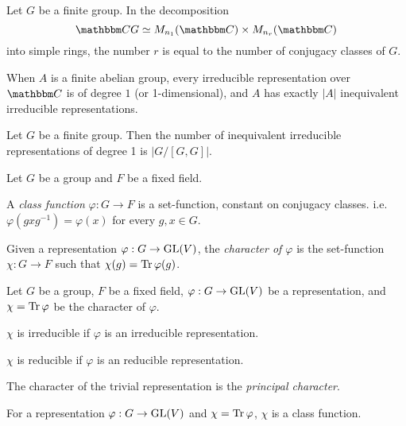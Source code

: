 \documentclass{article}
\begin{document}
\begin{theorem}
  Let \(G\) be a finite group.
  In the decomposition
  \[\bbC G \simeq M_{n_1}(\bbC) \times M_{n_r}(\bbC)\]
  into simple rings, the number \(r\) is equal to the number of
  conjugacy classes of \(G\).
\end{theorem}

\begin{corollary}
  When \(A\) is a finite abelian group,
  every irreducible representation over \(\bbC\) is of degree \(1\)
  (or 1-dimensional),
  and \(A\) has exactly \(|A|\) inequivalent irreducible representations.
\end{corollary}

\begin{theorem}
  Let \(G\) be a finite group.
  Then the number of inequivalent irreducible representations
  of degree 1 is \(|G / [G, G]|\).
\end{theorem}

\begin{definition}
  Let \(G\) be a group and \(F\) be a fixed field.

  A \emph{class function} \(\varphi: G \to F\) is a set-function,
  constant on conjugacy classes.
  i.e. \(\varphi(gxg^{-1}) = \varphi(x)\) for every \(g, x \in G\).

  Given a representation \(\varphi: G \to \textnormal{GL}(V)\), 
  the \emph{character of \(\varphi\)} is the set-function \(\chi: G \to F\)
  such that \(\chi(g) = \operatorname{Tr} \varphi(g)\).
\end{definition}

\begin{definition}
  Let \(G\) be a group, \(F\) be a fixed field, \(\varphi: G \to \textnormal{GL}(V)\) be a representation, and \(\chi = \operatorname{Tr} \varphi\) be the character of \(\varphi\).

  \(\chi\) is irreducible if \(\varphi\) is an irreducible representation.

  \(\chi\) is reducible if \(\varphi\) is an reducible representation.
\end{definition}

\begin{definition}
  The character of the trivial representation is the \emph{principal character}.
\end{definition}

\begin{theorem}
  For a representation \(\varphi: G \to \textnormal{GL}(V)\)
  and \(\chi = \operatorname{Tr} \varphi\), 
  \(\chi\) is a class function.
\end{theorem}
\end{document}
